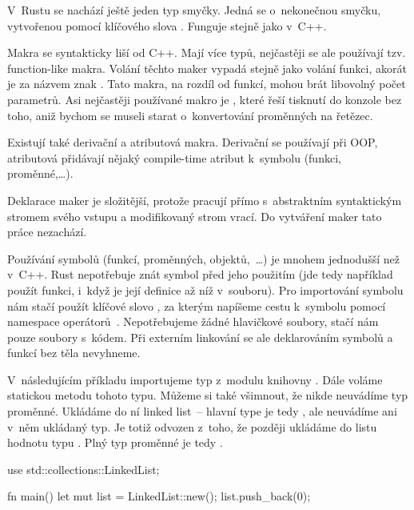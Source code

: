 \documentclass[main.tex]{subfiles}
\begin{document}

V~Rustu se nachází ještě jeden typ smyčky. Jedná se o~nekonečnou smyčku, vytvořenou
pomocí klíčového slova . Funguje stejně jako  v~C++.


Makra se syntakticky liší od C++. Mají více typů, nejčastěji se ale používají tzv.
function-like makra. Volání těchto maker vypadá stejně jako volání funkci, akorát je za
názvem znak \irust{!}. Tato makra, na rozdíl od funkcí, mohou brát libovolný počet
parametrů. Asi nejčastěji používané makro je , které řeší tisknutí do
konzole bez toho, aniž bychom se museli starat o~konvertování proměnných na řetězec.

Existují také derivační a atributová makra. Derivační se používají při OOP, atributová
přidávají nějaký compile-time atribut k~symbolu (funkci, proměnné,\dots).

Deklarace maker je složitější, protože pracují přímo s~abstraktním syntaktickým stromem
svého vstupu a modifikovaný strom vrací. Do vytváření maker tato práce nezachází.


Používání symbolů (funkcí, proměnných, objektů,~\dots) je mnohem jednodušší než v~C++.
Rust nepotřebuje znát symbol před jeho použitím (jde tedy například použít funkci, i~když
je její definice až níž v~souboru). Pro importování symbolu nám stačí použít klíčové slovo
, za kterým napíšeme cestu k~symbolu pomocí namespace operátorů~\irust{::}.
Nepotřebujeme žádné hlavičkové soubory, stačí nám pouze soubory s~kódem. Při externím
linkování se ale deklarováním symbolů a funkcí bez těla nevyhneme.

V~následujícím příkladu importujeme typ  z~modulu 
knihovny . Dále voláme statickou metodu  tohoto typu. Můžeme si také
všimnout, že nikde neuvádíme typ proměnné. Ukládáme do ní  linked list~-- hlavní
type je tedy , ale neuvádíme ani v~něm ukládaný typ. Je totiž odvozen
z~toho, že později ukládáme do listu hodnotu typu . Plný typ proměnné
 je tedy .

\obrazek
\begin{rustcode}
    use std::collections::LinkedList;

    fn main() {
        let mut list = LinkedList::new();
        list.push_back(0);
    }
\end{rustcode}
\end{document}

